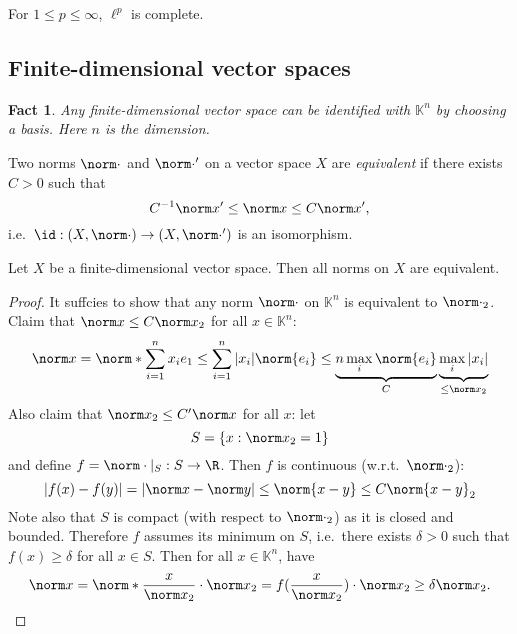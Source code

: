 \documentclass[a4paper]{article}
\newtheorem*{fact}{Fact}
\newcommand{\K}{{\mathbb{K}}} %
\begin{document}
\begin{corollary}
  For \(1 \leq p \leq \infty\), \(\ell^p\) is complete.
\end{corollary}

\subsection{Finite-dimensional vector spaces}

\begin{fact}
  Any finite-dimensional vector space can be identified with \(\K^n\) by choosing a basis. Here \(n\) is the dimension.
\end{fact}

\begin{definition}[equivalent]
  Two norms \(\norm \cdot\) and \(\norm \cdot'\) on a vector space \(X\) are \emph{equivalent} if there exists \(C > 0\) such that
  \[
    C^{-1} \norm x' \leq \norm x \leq C \norm x',
  \]
  i.e.\ \(\id: (X, \norm \cdot) \to (X, \norm \cdot ')\) is an isomorphism.
\end{definition}

\begin{theorem}
  Let \(X\) be a finite-dimensional vector space. Then all norms on \(X\) are equivalent.
\end{theorem}

\begin{proof}
  It suffcies to show that any norm \(\norm \cdot\) on \(\K^n\) is equivalent to \(\norm \cdot_2\). Claim that \(\norm x \leq C \norm x_2\) for all \(x \in \K^n\):
  \[
    \norm x
    = \norm*{\sum_{i = 1}^n x_i e_1}
    \leq \sum_{i = 1}^n |x_i| \norm{e_i}
    \leq \underbrace{n \max_i \norm{e_i}}_{C} \underbrace{\max_i|x_i|}_{\leq \norm x_2}
  \]
  Also claim that \(\norm x_2 \leq C' \norm x\) for all \(x\): let
  \[
    S = \{x: \norm x_2 = 1\}
  \]
  and define \(f = \norm \cdot |_S: S \to \R\). Then \(f\) is continuous (w.r.t.\ \(\norm \cdot_2\)):
  \[
    |f(x) - f(y)|
    = |\norm x - \norm y|
    \leq \norm{x - y}
    \leq C\norm{x - y}_2
  \]
  Note also that \(S\) is compact (with respect to \(\norm \cdot_2\)) as it is closed and bounded. Therefore \(f\) assumes its minimum on \(S\), i.e.\ there exists \(\delta > 0\) such that \(f(x) \geq \delta\) for all \(x \in S\). Then for all \(x \in \K^n\), have
  \[
    \norm x = \norm*{\frac{x}{\norm x_2}} \cdot \norm x_2 = f(\frac{x}{\norm x_2}) \cdot \norm x_2
    \geq \delta \norm x_2.
  \]
\end{proof}
\end{document}
